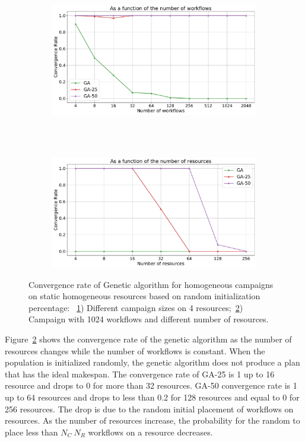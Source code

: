 \begin{figure}[ht!]
    \centering
    \begin{subfigure}[b]{0.75\textwidth}
        \includegraphics[width=.95\textwidth]{figures/campaign/StHomoCampaigns_4StHomoResourcesGAconv.pdf}
        \caption{}
        \label{fig:ga_conv1}
    \end{subfigure}\\
    ~ 
    \begin{subfigure}[b]{0.75\textwidth}
        \includegraphics[width=.95\textwidth]{figures/campaign/HomogeResources_StHomogeCampaignsGAconv.pdf}
        \caption{}
        \label{fig:ga_conv2}
    \end{subfigure}
    \caption{Convergence rate of Genetic algorithm for homogeneous campaigns on static homogeneous resources based on random initialization percentage: ~\ref{fig:ga_conv1}) Different campaign sizes on 4 resources;~\ref{fig:ga_conv2}) Campaign with 1024 workflows and different number of resources.}
    \label{fig:conv_rate}
\end{figure}

Figure~\ref{fig:ga_conv2} shows the convergence rate of the genetic algorithm as the number of resources changes while the number of workflows is constant.
When the population is initialized randomly, the genetic algorithm does not produce a plan that has the ideal makespan.
The convergence rate of GA-25 is 1 up to 16 resource and drops to 0 for more than 32 resources.
GA-50 convergence rate is 1 up to 64 resources and drops to less than 0.2 for 128 resources and equal to 0 for 256 resources.
The drop is due to the random initial placement of workflows on resources.
As the number of resources increase, the probability for the random to place less than $ N_{C} \ N_{R} $ workflows on a resource decreases.


